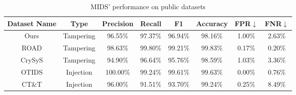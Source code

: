 \documentclass[lettersize,journal]{IEEEtran}
\begin{document}
\begin{table}[!ht]
\caption{MIDS' performance on public datasets}
\label{tab6}
\begin{center}
\renewcommand{\arraystretch}{1.2} %
\begin{tabular}{cccccccc} 
\hline
Dataset Name & Type & \textbf{Precision} & \textbf{Recall} & \textbf{F1} & \textbf{Accuracy} & \textbf{FPR}\(\downarrow\) & \textbf{FNR}\(\downarrow\) \\
\hline
Ours & Tampering & 96.55\% & 97.37\% & 96.94\% & 98.16\% & 1.00\% & 2.63\% \\
ROAD\cite{b34} & Tampering & 98.63\% & 99.80\% & 99.21\% & 99.83\% & 0.17\% & 0.20\% \\
CrySyS\cite{b33} & Tampering & 94.90\% & 96.64\% & 95.76\% & 98.59\% & 1.03\% & 3.36\% \\
OTIDS\cite{b20} & Injection & 100.00\% & 99.24\% & 99.61\% & 99.63\% & 0.00\% & 0.76\% \\
CT\&T\cite{b28} & Injection & 96.00\% & 91.51\% & 93.70\% & 99.24\% & 0.25\% & 8.49\% \\
\hline
\end{tabular}
\end{center}
\end{table}
\end{document}

